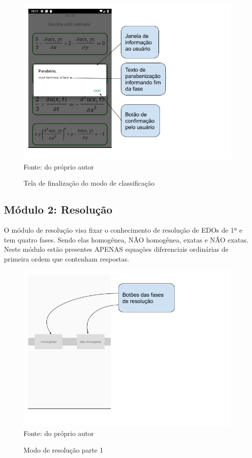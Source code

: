 \begin{figure}[H]
\centering
\caption{Tela de finalização do modo de classificação}
\includegraphics[scale=0.72]{figuras/fim_fase.png}
\small{Fonte: do próprio autor}
\end{figure}

\subsection[Módulo 2: Resolução]{Módulo 2: Resolução}

O módulo de resolução visa fixar o conhecimento de resolução de EDOs de 1ª e tem quatro fases. Sendo elas homogênea, NÃO homogênea, exatas e NÃO exatas. Neste módulo estão presentes APENAS equações diferenciais ordinárias de primeira ordem que contenham respostas. 

\begin{figure}[H]
\centering
\caption{Modo de resolução parte 1}
\includegraphics[scale=0.72]{figuras/modo_resolucao_1.png}
\small{Fonte: do próprio autor}
\end{figure}

